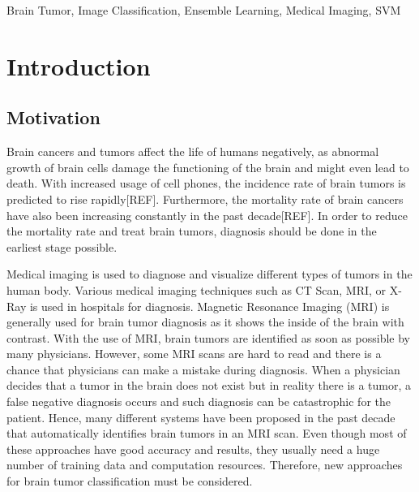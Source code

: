 \documentclass[conference]{IEEEtran}
\begin{document}
\begin{IEEEkeywords}
Brain Tumor, Image Classification, Ensemble Learning, Medical Imaging, SVM
\end{IEEEkeywords}

\section{Introduction}\label{intro}
\subsection{Motivation}
Brain cancers and tumors affect the life of humans negatively, as abnormal growth of brain cells damage the functioning of the brain and might even lead to death. With increased usage of cell phones, the incidence rate of brain tumors is predicted to rise rapidly[REF]. Furthermore, the mortality rate of brain cancers have also been increasing constantly in the past decade[REF]. In order to reduce the mortality rate and treat brain tumors, diagnosis should be done in the earliest stage possible. 

Medical imaging is used to diagnose and visualize different types of tumors in the human body. Various medical imaging techniques such as CT Scan, MRI, or X-Ray is used in hospitals for diagnosis. Magnetic Resonance Imaging (MRI) is generally used for brain tumor diagnosis as it shows the inside of the brain with contrast. With the use of MRI, brain tumors are identified as soon as possible by many physicians. However, some MRI scans are hard to read and there is a chance that physicians can make a mistake during diagnosis. When a physician decides that a tumor in the brain does not exist but in reality there is a tumor, a false negative diagnosis occurs and such diagnosis can be catastrophic for the patient. Hence, many different systems have been proposed in the past decade that automatically identifies brain tumors in an MRI scan. Even though most of these approaches have good accuracy and results, they usually need a huge number of training data and computation resources. Therefore, new approaches for brain tumor classification must be considered. 
\end{document}
